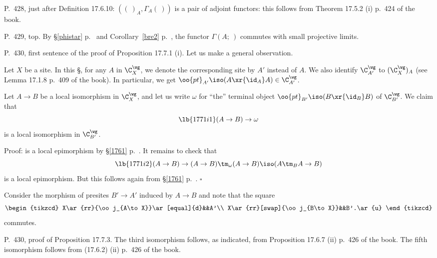 \documentclass[12pt]{article}
\theoremstyle{remark}
\theoremstyle{definition}
\begin{document}
%

\begin{s}
P.~428, just after Definition 17.6.10: $((\ )_A,\Gamma_A(\ ))$ is a pair of adjoint functors: this follows from Theorem 17.5.2 (i) p.~424 of the book. 
\end{s} 

%

\begin{s}
P.~429, top. By \S\ref{phistar} p.~ and Corollary~\ref{bre2} p.~, the functor $\Gamma(A;\ )$ commutes with small projective limits. 
\end{s} 

%

\begin{s} 
P.~430, first sentence of the proof of Proposition 17.7.1 (i). Let us make a general observation. 

Let $X$ be a site. In this \S, for any $A$ in $\C_X^\wg$, we denote the corresponding site by $A'$ instead of $A$. We also identify $\C_{A'}^\wg$ to $(\C_X^\wg)_A$ (see Lemma 17.1.8 p.~409 of the book). In particular, we get $\oo{pt}_{A'}\iso(A\xr{\id_A}A)\in\C_{A'}^\wg$. 

Let $A\to B$ be a local isomorphism in $\C_X^\wg$, and let us write $\omega$ for ``the'' terminal object $\oo{pt}_{B'}\iso(B\xr{\id_B}B)$ of $\C_{B'}^\wg$. We claim that 
\begin{equation}\lb{1771i1}
(A\to B)\to\omega 
\end{equation} 
is a local isomorphism in $\C_{B'}^\wg$.

Proof:  is a local epimorphism by \S\ref{1761} p.~. It remains to check that 
\begin{equation}\lb{1771i2}
(A\to B)\to(A\to B)\tm_\omega(A\to B)\iso(A\tm_BA\to B)
\end{equation} 
is a local epimorphism. But this follows again from \S\ref{1761} p.~. $\square$ 

Consider the morphism of presites $B'\to A'$ induced by $A\to B$ and note that the square
$$
\begin{tikzcd} 
X\ar{rr}{\oo j_{A\to X}}\ar[equal]{d}&&A'\\ 
X\ar{rr}[swap]{\oo j_{B\to X}}&&B'.\ar{u}
\end{tikzcd}
$$ 
commutes.
\end{s} 

%

\begin{s} 
P.~430, proof of Proposition 17.7.3. The third isomorphism follows, as indicated, from Proposition 17.6.7 (ii) p.~426 of the book. The fifth isomorphism follows from (17.6.2) (ii) p.~426 of the book. 
\end{s} 
\end{document}
